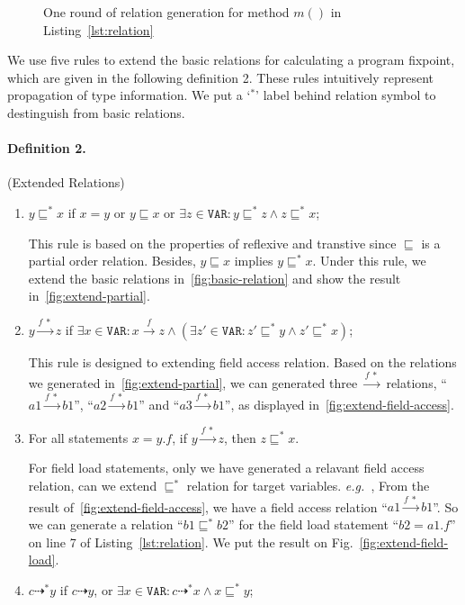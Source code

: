 \documentclass{fac}
\newcommand\eg{\textit{e.g.\ }}
\newcommand\Var{\mathtt{VAR}}
\newcommand{\less}{\sqsubseteq}
\newcommand{\tflow}{\dashrightarrow}
\newcommand{\hflow}{\longrightarrow}
\newcommand{\lhflow}[1]{\stackrel{#1}{\hflow}}
\begin{document}
\begin{figure}
\caption{One round of relation generation for method $m()$ in Listing~\ref{lst:relation}}
\label{fig:relations}
\end{figure}

We use five rules to extend the basic relations for  calculating a program fixpoint, which are given in the following definition 2. These rules intuitively represent propagation of type information. We put a `$^*$' label behind relation symbol to destinguish from basic relations.
\paragraph{Definition 2.}\label{def:extension} (Extended Relations)
\begin{enumerate}
  \item $y\less^* x$ if $x=y$ or $y\less x$ or $\exists z\in\Var:y\less^* z\wedge z\less^* x$;

  This rule is based on the properties of reflexive and transtive since $\less$ is a partial order relation. Besides, $y\less x$ implies $y\less^* x$. Under this rule, we extend the basic relations in~\ref{fig:basic-relation} and show the result in~\ref{fig:extend-partial}.

  \item $y\lhflow{f\ *}z$ if $\exists x\in\Var: x\lhflow{f}z\wedge (\exists z'\in\Var: z'\less^* y \wedge z'\less^*x)$;

  This rule is designed to extending field access relation. Based on the relations we generated in~\ref{fig:extend-partial}, we can generated three $\lhflow{f\ *}$ relations, ``$a1 \lhflow{f\ *} b1$'', ``$a2 \lhflow{f\ *} b1$'' and ``$a3 \lhflow{f\ *} b1$'', as displayed in~\ref{fig:extend-field-access}.

  \item For all statements $x = y.f $, if $y\lhflow{f\ *}z$, then $z\less^* x$.

  For field load statements, only we have generated a relavant field access relation, can we extend $\less^*$ relation for target variables. \eg, From the result of~\ref{fig:extend-field-access}, we have a field access relation ``$a1\lhflow{f\ *} b1$''. So we can generate a relation ``$b1\less^* b2$'' for the field load statement ``$b2=a1.f$'' on line 7 of Listing~\ref{lst:relation}. We put the result on Fig.~\ref{fig:extend-field-load}.

  \item $c\tflow^* y$ if $c\tflow y$, or $\exists x\in\Var:c\tflow^* x\wedge x\less^* y$;


\end{enumerate}
\end{document}
